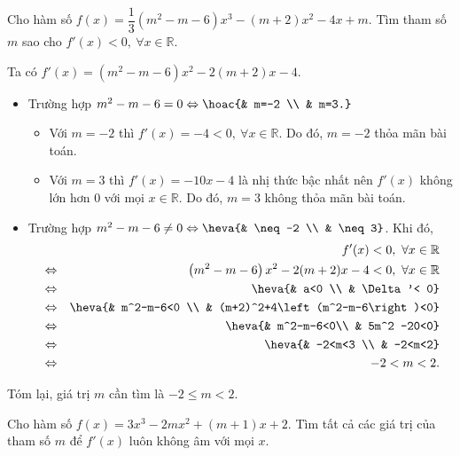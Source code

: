 \begin{bt}%
		Cho hàm số $f(x)=\dfrac{1}{3}\left(m^2-m-6\right)x^3-(m+2)x^2-4x+m$. Tìm tham số $m$ sao cho $f'(x)< 0,\ \forall x\in\mathbb{R}$.
		\loigiai
		{Ta có $f'(x)=\left(m^2-m-6\right)x^2-2(m+2)x-4$.\\
			\begin{itemize}
				\item Trường hợp $m^2-m-6=0\Leftrightarrow\hoac{& m=-2 \\ & m=3.}$
				\begin{itemize}
					\item Với $m=-2$ thì $f'(x)=-4<0,\ \forall x\in\mathbb{R}$. Do đó, $m=-2$ thỏa mãn bài toán.
					\item Với $m=3$ thì $f'(x)=-10x-4$ là nhị thức bậc nhất nên $f'(x)$ không lớn hơn $0$  với mọi $x\in\mathbb{R}$. Do đó, $m=3$ không thỏa mãn bài toán.
				\end{itemize}
				\item Trường hợp $m^2-m-6\neq 0\Leftrightarrow\heva{& \neq -2 \\ & \neq 3}$. Khi đó,
				\begin{eqnarray*}
					&& f'(x)< 0,\ \forall x\in\mathbb{R}\\
					&\Leftrightarrow & \left(m^2-m-6\right)x^2-2(m+2)x-4<0,\ \forall x\in\mathbb{R}\\
					&\Leftrightarrow &\heva{& a<0 \\ & \Delta'< 0}\\
					&\Leftrightarrow & \heva{& m^2-m-6<0 \\ & (m+2)^2+4\left(m^2-m-6\right)<0}\\
					&\Leftrightarrow & \heva{&  m^2-m-6<0\\ & 5m^2 -20<0}\\
					&\Leftrightarrow &\heva{& -2<m<3 \\ & -2<m<2}\\
					&\Leftrightarrow & -2< m< 2.
				\end{eqnarray*}
			\end{itemize}
			Tóm lại,  giá trị $m$ cần tìm là $-2\leq m<2$.
		}
	\end{bt}

\begin{bt}%

	Cho hàm số $f(x)=3x^3-2mx^2+\left(m+1\right)x+2$. Tìm tất cả các giá trị của tham số $m$ để $f'(x)$ luôn không âm với mọi $x$.
\end{bt}

